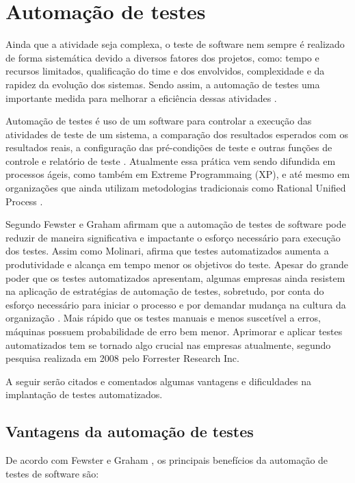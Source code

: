 \section{Automação de testes}

Ainda que a atividade seja complexa, o teste de software nem sempre é realizado de forma sistemática devido a diversos fatores dos projetos, como: tempo e recursos limitados, qualificação do time e dos envolvidos, complexidade e da rapidez da evolução dos sistemas. Sendo assim, a automação de testes uma importante medida para melhorar a eficiência dessas atividades \cite{Fantinato2004}.

Automação de testes é uso de um software para controlar a execução das atividades de teste de um sistema, a comparação dos resultados esperados com os resultados reais, a configuração das pré-condições de teste e outras funções de controle e relatório de teste \cite{Hooda2012}. Atualmente essa prática vem sendo difundida em processos ágeis, como também em Extreme Programmaing (XP), e até mesmo em organizações que ainda utilizam metodologias tradicionais como Rational Unified Process \cite{Lima2012}.

Segundo Fewster e Graham \cite{Fewster1999} afirmam que a automação de testes de software pode reduzir de maneira significativa e impactante o esforço necessário para execução dos testes. Assim como Molinari\cite{Molinari2010}, afirma que testes automatizados aumenta a produtividade e alcança em tempo menor os objetivos do teste. Apesar do grande poder que os testes automatizados apresentam, algumas empresas ainda resistem na aplicação de estratégias de automação de testes, sobretudo, por conta do esforço necessário para iniciar o processo e por demandar mudança na cultura da organização \cite{Lima2012}. Mais rápido que os testes manuais e menos suscetível a erros, máquinas possuem probabilidade de erro bem menor. Aprimorar e aplicar testes automatizados tem se tornado algo crucial nas empresas atualmente, segundo pesquisa realizada em 2008 pelo Forrester Research Inc.

A seguir serão citados e comentados algumas vantagens e dificuldades na implantação de testes automatizados.

\subsection{Vantagens da automação de testes}

De acordo com Fewster e Graham \cite{Fewster1999}, os principais benefícios da automação de testes de software são:

